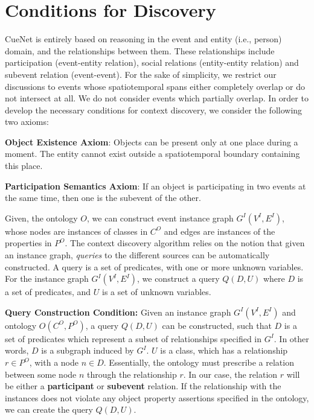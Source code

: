 \section{Conditions for Discovery}
\label{section:conditions-for-discovery}
CueNet is entirely based on reasoning in the event and entity (i.e., person) domain, and the relationships between them. These relationships include participation (event-entity relation), social relations (entity-entity relation) and subevent relation (event-event). For the sake of simplicity, we restrict our discussions to events whose spatiotemporal spans either completely overlap or do not intersect at all. We do not consider events which partially overlap. In order to develop the necessary conditions for context discovery, we consider the following two axioms:

\textbf{Object Existence Axiom}: Objects can be present only at one place during a moment. The entity cannot exist outside a spatiotemporal boundary containing this place.

\textbf{Participation Semantics Axiom}: If an object is participating in two events at the same time, then one is the subevent of the other. 


Given, the ontology $O$, we can construct event instance graph $G^I(V^I, E^I)$, whose nodes are instances of classes in $C^O$ and edges are instances of the properties in $P^O$. The context discovery algorithm relies on the notion that given an instance graph, \textit{queries} to the different sources can be automatically constructed. A query is a set of predicates, with one or more unknown variables. For the instance graph $G^I (V^I, E^I)$, we construct a query $Q(D, U)$ where $D$ is a set of predicates, and $U$ is a set of unknown variables.

\textbf{Query Construction Condition:} Given an instance graph $G^I (V^I, E^I)$ and ontology $O(C^O, P^O)$, a query $Q(D, U)$ can be constructed, such that $D$ is a set of predicates which represent a subset of relationships specified in $G^I$. In other words, $D$ is a subgraph induced by $G^I$. $U$ is a class, which has a relationship $r \in P^O$, with a node $n \in D$. Essentially, the ontology must prescribe a relation between some node $n$ through the relationship $r$. In our case, the relation $r$ will be either a \textbf{participant} or \textbf{subevent} relation. If the relationship with the instances does not violate any object property assertions specified in the ontology, we can create the query $Q(D, U)$.

